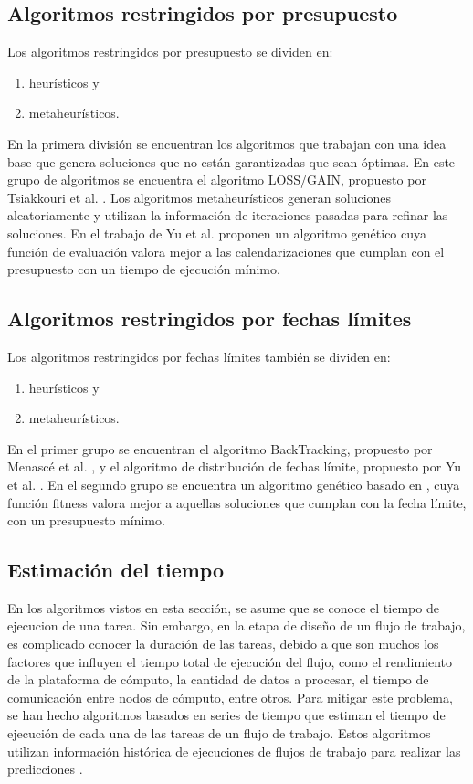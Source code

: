 \subsection{Algoritmos restringidos por presupuesto}

Los algoritmos restringidos por presupuesto se dividen en: 

\begin{enumerate}
\item{heurísticos y}
\item{metaheurísticos.}
\end{enumerate}

En la primera división se encuentran los algoritmos que trabajan con una idea base que genera soluciones que no están garantizadas que sean óptimas. En este grupo de algoritmos se encuentra el algoritmo LOSS/GAIN, propuesto por Tsiakkouri et al. \cite{sakellariou2007scheduling}. Los algoritmos metaheurísticos generan soluciones aleatoriamente y utilizan la información de iteraciones pasadas para refinar las soluciones. En el trabajo de Yu et al. \cite{yu2006scheduling} proponen un algoritmo genético cuya función de evaluación valora mejor a las calendarizaciones que cumplan con el presupuesto con un tiempo de ejecución mínimo.

\subsection{Algoritmos restringidos por fechas límites}

Los algoritmos restringidos por fechas límites también se dividen en:

\begin{enumerate}
\item{heurísticos y}
\item{metaheurísticos.}
\end{enumerate}

En el primer grupo se encuentran el algoritmo BackTracking, propuesto por Menascé et al. \cite{menasce2004framework}, y el algoritmo de distribución de fechas límite, propuesto por Yu et al. \cite{yu2005cost}. En el segundo grupo se encuentra un algoritmo genético basado en \cite{yu2006scheduling}, cuya función fitness valora mejor a aquellas soluciones que cumplan con la fecha límite, con un presupuesto mínimo.

\subsection{Estimación del tiempo}
En los algoritmos vistos en esta sección, se asume que se conoce el tiempo de ejecucion de una tarea. Sin embargo, en la etapa de diseño de un flujo de trabajo, es complicado conocer la duración de las tareas, debido a que son muchos los factores que influyen el tiempo total de ejecución del flujo, como el rendimiento de la plataforma de cómputo, la cantidad de datos a procesar, el tiempo de comunicación entre nodos de cómputo, entre otros. Para mitigar este problema, se han hecho algoritmos basados en series de tiempo que estiman el tiempo de ejecución de cada una de las tareas de un flujo de trabajo. Estos algoritmos utilizan información histórica de ejecuciones de flujos de trabajo para realizar las predicciones  \cite{liu2011novel}.
